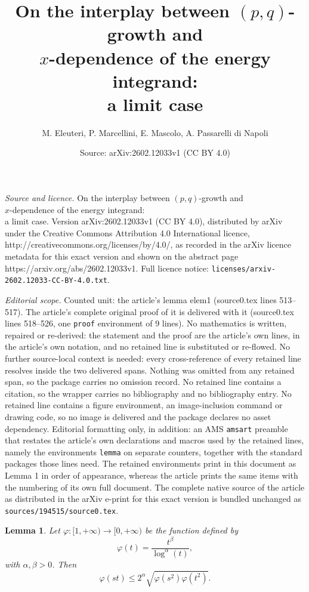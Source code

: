 \documentclass[10pt,a4paper]{amsart}
\title{On the interplay between $(p,q)$-growth and \\ $x$-dependence of the energy integrand:\\ a limit case}
\author{M. Eleuteri, P. Marcellini, E. Mascolo, A. Passarelli di Napoli}
\date{Source: arXiv:2602.12033v1 (CC BY 4.0)}
\newtheorem{lemma}{Lemma}
\begin{document}
\maketitle

\noindent\emph{Source and licence.} On the interplay between $(p,q)$-growth and \\ $x$-dependence of the energy integrand:\\ a limit case. Version arXiv:2602.12033v1 (CC BY 4.0), distributed by arXiv under the Creative Commons Attribution 4.0 International licence, http://creativecommons.org/licenses/by/4.0/, as recorded in the arXiv licence metadata for this exact version and shown on the abstract page https://arxiv.org/abs/2602.12033v1. Full licence notice: \texttt{licenses/arxiv-2602.12033-CC-BY-4.0.txt}.\par\smallskip

\noindent\textit{Editorial scope.} Counted unit: the article's lemma elem1 (source0.tex lines 513--517). The article's complete original proof of it is delivered with it (source0.tex lines 518--526, one \texttt{proof} environment of 9 lines). No mathematics is written, repaired or re-derived: the statement and the proof are the article's own lines, in the article's own notation, and no retained line is substituted or re-flowed.  No further source-local context is needed: every cross-reference of every retained line resolves inside the two delivered spans.  Nothing was omitted from any retained span, so the package carries no omission record.  No retained line contains a citation, so the wrapper carries no bibliography and no bibliography entry.  No retained line contains a figure environment, an image-inclusion command or drawing code, so no image is delivered and the package declares no asset dependency.  Editorial formatting only, in addition: an AMS \texttt{amsart} preamble that restates the article's own declarations and macros used by the retained lines, namely the environments \texttt{lemma} on separate counters, together with the standard packages those lines need.  The retained environments print in this document as Lemma 1 in order of appearance, whereas the article prints the same items with the numbering of its own full document.  The complete native source of the article as distributed in the arXiv e-print for this exact version is bundled unchanged as \texttt{sources/194515/source0.tex}.
\begin{lemma}\label{elem1} Let $\varphi:{[1,+\infty)}\to [0,+\infty)$ be the function defined by
$$ \varphi(t)=\frac{t^\beta}{\log^{\alpha}(t)},$$
with $\alpha,\beta>0$. Then
$$\varphi(st)\le 2^{\alpha}\sqrt{\varphi(s^2)\varphi(t^2)}.$$
\end{lemma}
\end{document}
